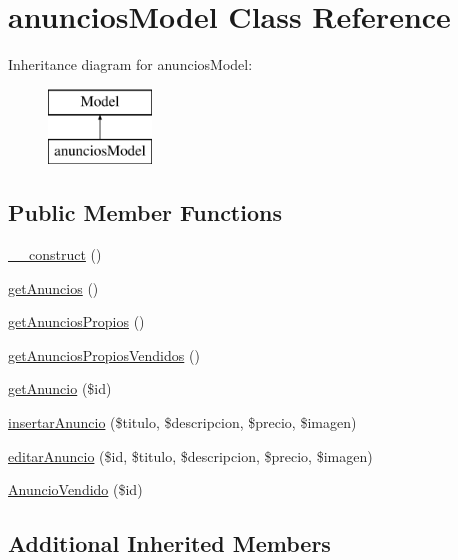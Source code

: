 \hypertarget{classanuncios_model}{}\section{anuncios\+Model Class Reference}
\label{classanuncios_model}
Inheritance diagram for anuncios\+Model\+:\begin{figure}[H]
\begin{center}
\leavevmode
\includegraphics[height=2.000000cm]{classanuncios_model}
\end{center}
\end{figure}
\subsection*{Public Member Functions}
\begin{DoxyCompactItemize}
\item 
\hyperlink{classanuncios_model_a095c5d389db211932136b53f25f39685}{\+\_\+\+\_\+construct} ()
\item 
\hyperlink{classanuncios_model_a90b5c5ef47c438b497bd80131050de00}{get\+Anuncios} ()
\item 
\hyperlink{classanuncios_model_aaa2dbc80dc1f8c21eb185bc9c1a5b9c9}{get\+Anuncios\+Propios} ()
\item 
\hyperlink{classanuncios_model_a20dad611a56b5856bb89295b8f2ee4bf}{get\+Anuncios\+Propios\+Vendidos} ()
\item 
\hyperlink{classanuncios_model_affa35fd5f226ef287f9e253dd8fe6afa}{get\+Anuncio} (\$id)
\item 
\hyperlink{classanuncios_model_ade22cf38062bc3a0fd8a0139f7fa2f7f}{insertar\+Anuncio} (\$titulo, \$descripcion, \$precio, \$imagen)
\item 
\hyperlink{classanuncios_model_a7c30692c89928b88b2b3843f35940db7}{editar\+Anuncio} (\$id, \$titulo, \$descripcion, \$precio, \$imagen)
\item 
\hyperlink{classanuncios_model_a0ad32e34084c0228a30a3c9f9daa6af5}{Anuncio\+Vendido} (\$id)
\end{DoxyCompactItemize}
\subsection*{Additional Inherited Members}


